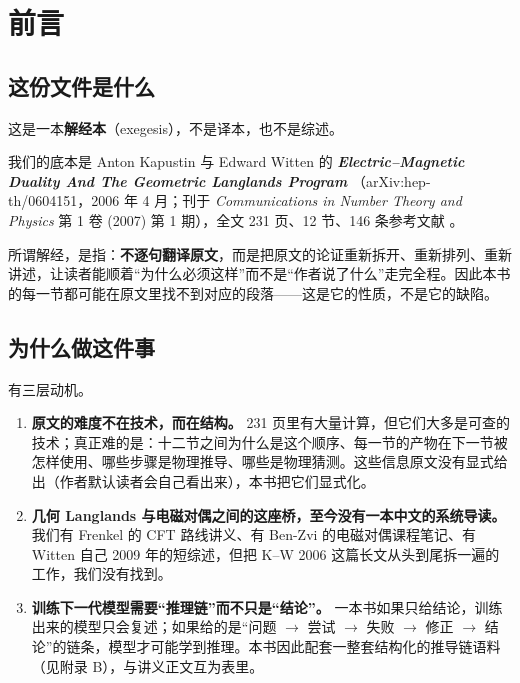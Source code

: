
\section*{前言}

\subsection*{这份文件是什么}

这是一本\textbf{解经本}（exegesis），不是译本，也不是综述。

我们的底本是 Anton Kapustin 与 Edward Witten 的
\textbf{\emph{Electric--Magnetic Duality And The Geometric Langlands Program}}
（arXiv:hep-th/0604151，2006 年 4 月；刊于 \emph{Communications in Number Theory and Physics} 第 1 卷 (2007) 第 1 期），全文 231 页、12 节、146 条参考文献 。

所谓解经，是指：\textbf{不逐句翻译原文}，而是把原文的论证重新拆开、重新排列、重新讲述，让读者能顺着“为什么必须这样”而不是“作者说了什么”走完全程。因此本书的每一节都可能在原文里找不到对应的段落——这是它的性质，不是它的缺陷。

\subsection*{为什么做这件事}

有三层动机。

\begin{enumerate}[label=(\arabic*)]
\item \textbf{原文的难度不在技术，而在结构。} 231 页里有大量计算，但它们大多是可查的技术；真正难的是：十二节之间为什么是这个顺序、每一节的产物在下一节被怎样使用、哪些步骤是物理推导、哪些是物理猜测。这些信息原文没有显式给出（作者默认读者会自己看出来），本书把它们显式化。
\item \textbf{几何 Langlands 与电磁对偶之间的这座桥，至今没有一本中文的系统导读。} 我们有 Frenkel 的 CFT 路线讲义、有 Ben-Zvi 的电磁对偶课程笔记、有 Witten 自己 2009 年的短综述，但把 K--W 2006 这篇长文从头到尾拆一遍的工作，我们没有找到。
\item \textbf{训练下一代模型需要“推理链”而不只是“结论”。} 一本书如果只给结论，训练出来的模型只会复述；如果给的是“问题 $\to$ 尝试 $\to$ 失败 $\to$ 修正 $\to$ 结论”的链条，模型才可能学到推理。本书因此配套一整套结构化的推导链语料（见附录 B），与讲义正文互为表里。
\end{enumerate}


